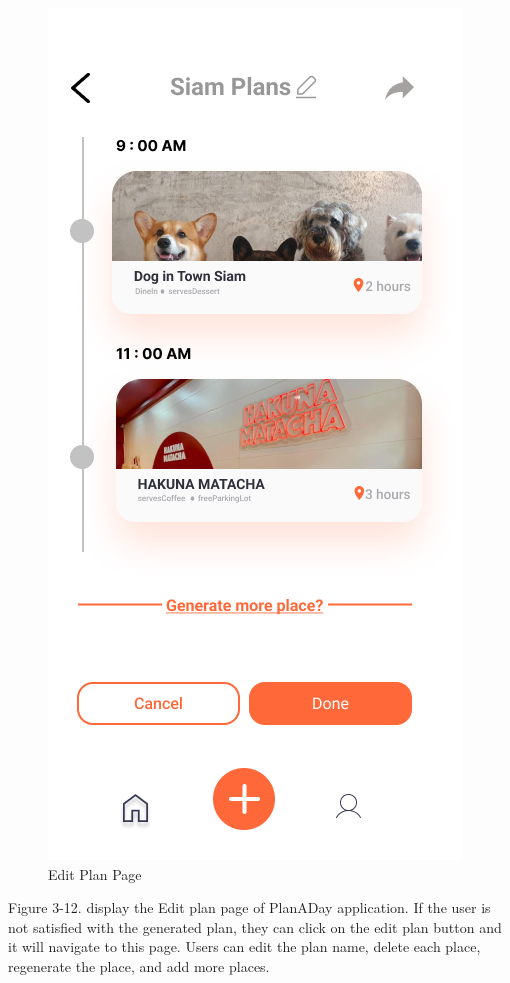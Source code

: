 \newpage
\begin{figure}[!h]
    \centering
    \includegraphics[width=0.5\linewidth]{chapter3/UI_Edit_plan.png}
    \caption{Edit Plan Page}
    \label{fig:Edit Plan Page}
\end{figure}
\noindent
Figure 3-12. display the Edit plan page of PlanADay application. If the user is not
satisfied with the generated plan, they can click on the edit plan button and it will
navigate to this page. Users can edit the plan name, delete each place, regenerate
the place, and add more places.

